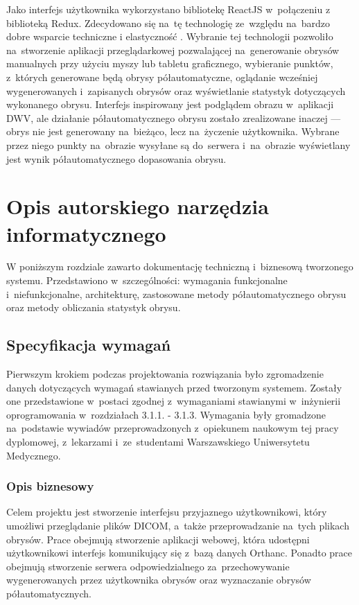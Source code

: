 \documentclass[a4paper,11pt,twoside,openright]{report}
\newcommand\blankpage{%
    \null
    \thispagestyle{empty}%
    \newpage}
\theoremstyle{definition}
\begin{document}
Jako interfejs użytkownika wykorzystano bibliotekę ReactJS \cite{React} w~połączeniu
z biblioteką Redux\cite{Redux}. Zdecydowano się na~tę technologię ze~względu na~bardzo dobre wsparcie techniczne
i elastyczność \cite{Dlaczego react}. Wybranie tej technologii pozwoliło na~stworzenie
aplikacji przeglądarkowej pozwalającej na~generowanie obrysów manualnych przy
użyciu myszy lub tabletu graficznego, wybieranie punktów, z~których generowane
będą obrysy półautomatyczne, oglądanie wcześniej wygenerowanych i~zapisanych
obrysów oraz wyświetlanie statystyk dotyczących wykonanego obrysu. Interfejs
inspirowany jest podglądem obrazu w~aplikacji DWV, ale działanie półautomatycznego
obrysu zostało zrealizowane inaczej --- obrys nie jest generowany na~bieżąco, lecz na~życzenie
użytkownika. Wybrane przez niego punkty na~obrazie wysyłane są do~serwera i~na~obrazie wyświetlany jest
wynik półautomatycznego dopasowania obrysu.


\chapter {Opis autorskiego narzędzia informatycznego}

W poniższym rozdziale zawarto dokumentację techniczną i~biznesową tworzonego systemu.
 Przedstawiono w~szczególności: wymagania funkcjonalne i~niefunkcjonalne,
 architekturę, zastosowane metody półautomatycznego obrysu oraz metody obliczania
 statystyk obrysu.

\section {Specyfikacja wymagań}

Pierwszym krokiem podczas projektowania rozwiązania było zgromadzenie danych dotyczących wymagań stawianych
przed tworzonym systemem. Zostały one przedstawione w~postaci zgodnej z~wymaganiami
stawianymi w~inżynierii oprogramowania w~rozdziałach 3.1.1. - 3.1.3. Wymagania
były gromadzone na~podstawie wywiadów przeprowadzonych z~opiekunem naukowym tej
pracy dyplomowej, z~lekarzami i~ze~studentami Warszawskiego Uniwersytetu Medycznego.

\subsection {Opis biznesowy}

Celem projektu jest stworzenie interfejsu przyjaznego użytkownikowi, który umożliwi
przeglądanie plików DICOM, a~także przeprowadzanie na~tych plikach obrysów. Prace
obejmują stworzenie aplikacji webowej, która udostępni użytkownikowi interfejs
komunikujący się z~bazą danych Orthanc. Ponadto prace obejmują stworzenie serwera
odpowiedzialnego za~przechowywanie wygenerowanych przez użytkownika obrysów oraz
wyznaczanie obrysów półautomatycznych.
\end{document}
